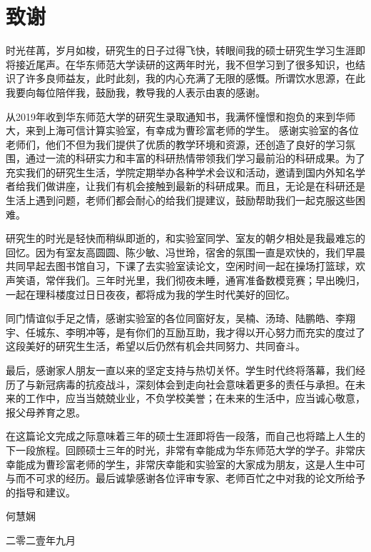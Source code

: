 {\fangsong
	\chapter*{致\qquad 谢}\vskip 2mm
	\vspace{-1cm}
		\large{

时光荏苒，岁月如梭，研究生的日子过得飞快，转眼间我的硕士研究生学习生涯即将接近尾声。在华东师范大学读研的这两年时光，我不但学习到了很多知识，也结识了许多良师益友，此时此刻，我的内心充满了无限的感慨。所谓饮水思源，在此我要向每位陪伴我，鼓励我，教导我的人表示由衷的感谢。

从2019年收到华东师范大学的研究生录取通知书，我满怀憧憬和抱负的来到华师大，来到上海可信计算实验室，有幸成为曹珍富老师的学生。
感谢实验室的各位老师们，他们不但为我们提供了优质的教学环境和资源，还创造了良好的学习氛围，通过一流的科研实力和丰富的科研热情带领我们学习最前沿的科研成果。为了充实我们的研究生生活，学院定期举办各种学术会议和活动，邀请到国内外知名学者给我们做讲座，让我们有机会接触到最新的科研成果。而且，无论是在科研还是生活上遇到问题，老师们都会耐心的给我们提建议，鼓励帮助我们一起克服这些困难。

研究生的时光是轻快而稍纵即逝的，和实验室同学、室友的朝夕相处是我最难忘的回忆。因为有室友高圆圆、陈少敏、冯世玲，宿舍的氛围一直是欢快的，我们早晨共同早起去图书馆自习，下课了去实验室读论文，空闲时间一起在操场打篮球，欢声笑语，常伴我们。三年时光里，我们彻夜未睡，通宵准备数模竞赛；早出晚归，一起在理科楼度过日日夜夜，都将成为我的学生时代美好的回忆。

同门情谊似手足之情，感谢实验室的各位同窗好友，吴楠、汤琦、陆鹏皓、李翔宇、任城东、李明冲等，是有你们的互励互助，我才得以开心努力而充实的度过了这段美好的研究生生活，希望以后仍然有机会共同努力、共同奋斗。

最后，感谢家人朋友一直以来的坚定支持与热切关怀。学生时代终将落幕，我们经历了与新冠病毒的抗疫战斗，深刻体会到走向社会意味着更多的责任与承担。在未来的工作中，应当当兢兢业业，不负学校美誉；在未来的生活中，应当诚心敬意，报父母养育之恩。 

在这篇论文完成之际意味着三年的硕士生涯即将告一段落，而自己也将踏上人生的下一段旅程。回顾硕士三年的时光，非常有幸能成为华东师范大学的学子。非常庆幸能成为曹珍富老师的学生，非常庆幸能和实验室的大家成为朋友，这是人生中可与而不可求的经历。最后诚挚感谢各位评审专家、老师百忙之中对我的论文所给予的指导和建议。

	}
	
	\vspace{0.2cm}
	
	\vspace{0.2cm} \hspace{9.8cm}
	何慧娴
	
	\hspace{9cm}  二零二壹年九月

} 